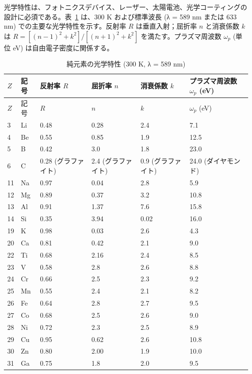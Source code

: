 \documentclass[11pt,a4paper]{article}
\theoremstyle{remark}
\begin{document}
	光学特性は、フォトニクスデバイス、レーザー、太陽電池、光学コーティングの設計に必須である。表~\ref{tab:optical-properties-func} は、300 K および標準波長 (λ = 589 nm または 633 nm) での主要な光学特性を示す。反射率 \(R\) は垂直入射；屈折率 \(n\) と消衰係数 \(k\) は \(R = [(n-1)^2 + k^2]/[(n+1)^2 + k^2]\) を満たす。プラズマ周波数 \(\omega_p\) (単位 eV) は自由電子密度に関係する。
	
	\begin{longtable}{p{0.8cm}p{1.2cm}p{2.2cm}p{2.2cm}p{2.2cm}p{2.2cm}}
		\caption{純元素の光学特性 (300 K, λ = 589 nm)} \label{tab:optical-properties-func} \\
		\toprule
		\(Z\) & 記号 & 反射率 \(R\) & 屈折率 \(n\) & 消衰係数 \(k\) & プラズマ周波数 \(\omega_p\) (eV) \\
		\midrule
		\endfirsthead
		\toprule
		\(Z\) & 記号 & \(R\) & \(n\) & \(k\) & \(\omega_p\) (eV) \\
		\midrule
		\endhead
		3  & Li & 0.48 & 0.28 & 2.4 & 7.1 \\
		4  & Be & 0.55 & 0.85 & 1.9 & 12.5 \\
		5  & B  & 0.42 & 3.0 & 1.8 & 23.0 \\
		6  & C  & 0.28 (グラファイト) & 2.4 (グラファイト) & 0.9 (グラファイト) & 24.0 (ダイヤモンド) \\
		11 & Na & 0.97 & 0.04 & 2.8 & 5.9 \\
		12 & Mg & 0.89 & 0.37 & 3.2 & 10.8 \\
		13 & Al & 0.91 & 1.37 & 7.6 & 15.8 \\
		14 & Si & 0.35 & 3.94 & 0.02 & 16.0 \\
		19 & K  & 0.98 & 0.03 & 2.6 & 4.3 \\
		20 & Ca & 0.81 & 0.42 & 2.1 & 9.0 \\
		22 & Ti & 0.68 & 2.16 & 2.4 & 8.5 \\
		23 & V  & 0.58 & 2.8 & 2.6 & 8.8 \\
		24 & Cr & 0.66 & 2.5 & 2.3 & 9.2 \\
		25 & Mn & 0.55 & 2.4 & 2.1 & 8.2 \\
		26 & Fe & 0.64 & 2.8 & 2.7 & 9.5 \\
		27 & Co & 0.68 & 2.5 & 2.6 & 9.0 \\
		28 & Ni & 0.72 & 2.3 & 2.5 & 8.9 \\
		29 & Cu & 0.95 & 0.62 & 2.6 & 10.8 \\
		30 & Zn & 0.80 & 2.00 & 1.9 & 10.0 \\
		31 & Ga & 0.75 & 1.8 & 2.0 & 9.5 \\

\end{longtable}
\end{document}
